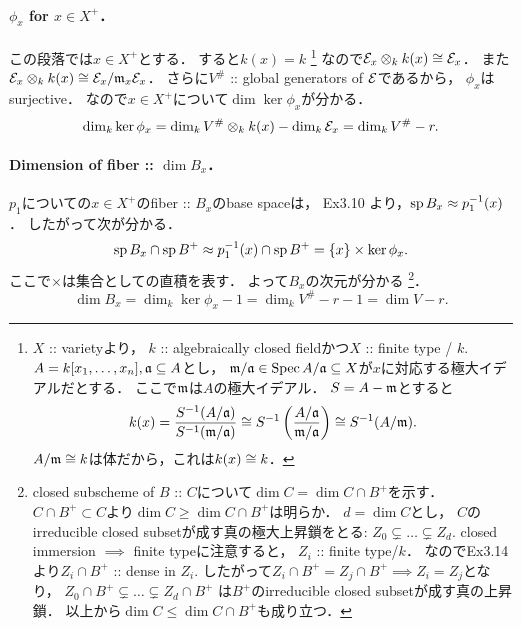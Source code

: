 \documentclass[a4paper]{jsarticle}
\begin{document}
    \paragraph{$\phi_x$ for $x \in X^+$．}
    この段落では$x \in X^+$とする．
    すると$k(x)=k$
    \footnote
    {
        $X$ :: varietyより，
        $k$ :: algebraically closed fieldかつ$X$ :: finite type / $k$.
        $A=k[x_1,\dots,x_n], \mathfrak{a} \subseteq A$とし，
        $\mathfrak{m}/\mathfrak{a} \in \operatorname{Spec} A/\mathfrak{a} \subseteq X$が$x$に対応する極大イデアルだとする．
        ここで$\mathfrak{m}$は$A$の極大イデアル．
        $S=A-\mathfrak{m}$とすると
        \[
            k(x)
            =\frac{S^{-1}(A/\mathfrak{a})}{S^{-1}(\mathfrak{m}/\mathfrak{a})}
            \cong S^{-1}\left( \frac{A/\mathfrak{a}}{\mathfrak{m}/\mathfrak{a}} \right)
            \cong S^{-1}(A/\mathfrak{m}).
        \]
        $A/\mathfrak{m} \cong k$は体だから，これは$k(x) \cong k$．
    }
    なので$\mathcal{E}_x \otimes_k k(x) \cong \mathcal{E}_x$．
    また$\mathcal{E}_x \otimes_k k(x) \cong \mathcal{E}_x/\mathfrak{m}_x\mathcal{E}_x$．
    さらに$V^{\#}$ :: global generators of $\mathcal{E}$であるから，
    $\phi_x$はsurjective．
    なので$x \in X^+$について$\dim \ker \phi_x$が分かる．
    \[
        \dim_k \ker \phi_x
        =\dim_k V^{\#} \otimes_k k(x)-\dim_k \mathcal{E}_x
        =\dim_k V^{\#}-r.
    \]

    \paragraph{Dimension of fiber :: $\dim B_x$．}
    $p_1$についての$x \in X^+$のfiber :: $B_x$のbase spaceは，
    Ex3.10 より，$\operatorname{sp} B_x \approx p_1^{-1}(x)$．
    したがって次が分かる．
    \[ \operatorname{sp} B_x \cap \operatorname{sp} B^+ \approx p_1^{-1}(x) \cap \operatorname{sp} B^+=\{x\} \times \ker \phi_x. \]
    ここで$\times$は集合としての直積を表す．
    よって$B_x$の次元が分かる
    \footnote
    {
        closed subscheme of $B$ :: $C$について$\dim C=\dim C \cap B^+$を示す．
        $C \cap B^+ \subset C$より$\dim C \geq \dim C \cap B^+$は明らか．
        $d=\dim C$とし，
        $C$のirreducible closed subsetが成す真の極大上昇鎖をとる:
        $Z_0 \subsetneq \dots \subsetneq Z_d.$
        closed immersion $\implies$ finite typeに注意すると，
        $Z_i$ :: finite type/$k$．
        なのでEx3.14より$Z_i \cap B^+$ :: dense in $Z_i$.
        したがって$Z_i \cap B^+=Z_j \cap B^+ \implies Z_i=Z_j$となり，
        $Z_0 \cap B^+ \subsetneq \dots \subsetneq Z_d \cap B^+$
        は$B^+$のirreducible closed subsetが成す真の上昇鎖．
        以上から$\dim C \leq \dim C \cap B^+$も成り立つ．
    }．
    \[ \dim B_x=\dim_k \ker \phi_x-1=\dim_k V^{\#}-r-1=\dim V-r. \]
\end{document}
